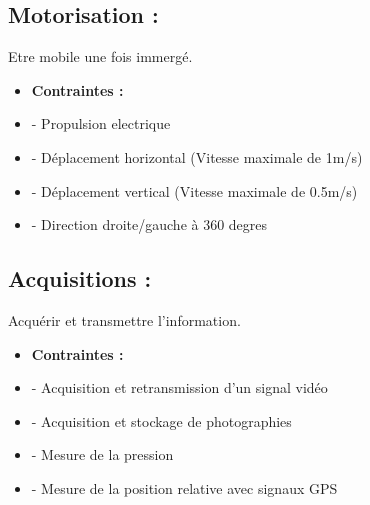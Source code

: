 \documentclass[a4paper,11pt]{report}
\begin{document}
\subsection{Motorisation :}
Etre mobile une fois immergé. \newline
\begin{itemize}
	\item \textbf{Contraintes :}
	\item - Propulsion electrique
	\item - Déplacement horizontal (Vitesse maximale de 1m/s)
	\item - Déplacement vertical (Vitesse maximale de 0.5m/s)
	\item - Direction droite/gauche à 360 degres   \newline \newline
\end{itemize}

\subsection{Acquisitions :}
Acquérir et transmettre l'information. \newline
\begin{itemize}
	\item \textbf{Contraintes :}
	\item - Acquisition et retransmission d'un signal vidéo
	\item - Acquisition et stockage de photographies
	\item - Mesure de la pression
	\item - Mesure de la position relative avec signaux GPS
\end{itemize}
\end{document}
